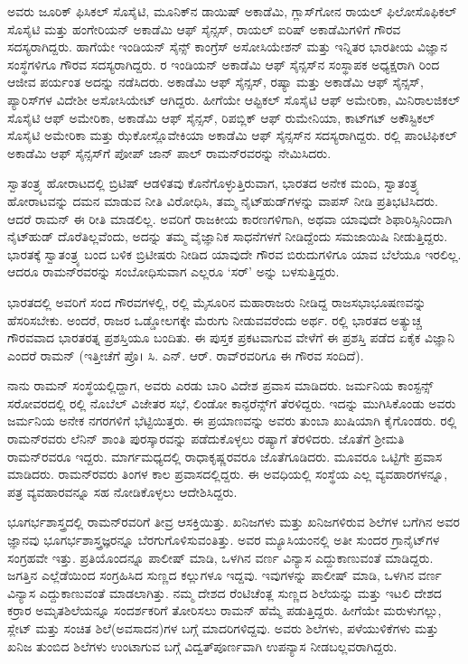 ಅವರು ಜೂರಿಕ್ ಫಿಸಿಕಲ್ ಸೊಸೈಟಿ, ಮೂನಿಕ್‌ನ ಡಾಯಿಷ್ ಅಕಾಡೆಮಿ, ಗ್ಲಾಸ್‌ಗೋನ ರಾಯಲ್ ಫಿಲೋಸೊಫಿಕಲ್ ಸೊಸೈಟಿ ಮತ್ತು ಹಂಗೇರಿಯನ್ ಅಕಾಡೆಮಿ ಆಫ್ ಸೈನ್ಸಸ್, ರಾಯಲ್ ಐರಿಷ್ ಅಕಾಡೆಮಿಗಳಿಗೆ ಗೌರವ ಸದಸ್ಯರಾಗಿದ್ದರು. ಹಾಗೆಯೇ ಇಂಡಿಯನ್ ಸೈನ್ಸ್ ಕಾಂಗ್ರೆಸ್ ಅಸೋಸಿಯೇಶನ್ ಮತ್ತು ಇನ್ನಿತರ ಭಾರತೀಯ ವಿಜ್ಞಾನ ಸಂಸ್ಥೆಗಳಿಗೂ ಗೌರವ ಸದಸ್ಯರಾಗಿದ್ದರು.  ರ ಇಂಡಿಯನ್ ಅಕಾಡೆಮಿ ಆಫ್ ಸೈನ್ಸಸ್‌ನ ಸಂಸ್ಥಾಪಕ ಅಧ್ಯಕ್ಷರಾಗಿ  ರಿಂದ ಆಜೀವ ಪರ್ಯಂತ ಅದನ್ನು ನಡೆಸಿದರು. ಅಕಾಡೆಮಿ ಆಫ್ ಸೈನ್ಸಸ್, ರಷ್ಯಾ ಮತ್ತು ಅಕಾಡೆಮಿ ಆಫ್ ಸೈನ್ಸಸ್, ಪ್ಯಾರಿಸ್‍ಗಳ ವಿದೇಶೀ ಅಸೋಸಿಯೇಟ್ ಆಗಿದ್ದರು. ಹೀಗೆಯೇ ಆಪ್ಟಿಕಲ್ ಸೊಸೈಟಿ ಆಫ್ ಅಮೇರಿಕಾ, ಮಿನಿರಾಲಜಿಕಲ್ ಸೊಸೈಟಿ ಆಫ್ ಅಮೇರಿಕಾ, ಅಕಾಡೆಮಿ ಆಫ್ ಸೈನ್ಸಸ್, ರಿಪಬ್ಲಿಕ್ ಆಫ್ ರುಮೇನಿಯಾ, ಕಾಟ್‍ಗಟ್ ಅಕೌಸ್ಟಿಕಲ್ ಸೊಸೈಟಿ ಅಮೇರಿಕಾ ಮತ್ತು ಝೆಕೋಸ್ಲೊವೇಕಿಯಾ ಅಕಾಡೆಮಿ ಆಫ್ ಸೈನ್ಸಸ್‌ನ ಸದಸ್ಯರಾಗಿದ್ದರು.  ರಲ್ಲಿ ಪಾಂಟಿಫಿಕಲ್ ಅಕಾಡೆಮಿ ಆಫ್ ಸೈನ್ಸಸ್‌ಗೆ ಪೋಪ್ ಜಾನ್ ಪಾಲ್ ರಾಮನ್‍ರವರನ್ನು ನೇಮಿಸಿದರು.

ಸ್ವಾತಂತ್ರ್ಯ ಹೋರಾಟದಲ್ಲಿ ಬ್ರಿಟಿಷ್ ಆಡಳಿತವು ಕೊನೆಗೊಳ್ಳುತ್ತಿರುವಾಗ, ಭಾರತದ ಅನೇಕ ಮಂದಿ, ಸ್ವಾತಂತ್ರ್ಯ ಹೋರಾಟವನ್ನು ದಮನ ಮಾಡುವ ನೀತಿ ವಿರೋಧಿಸಿ, ತಮ್ಮ ನೈಟ್‍ಹುಡ್‍‌ಗಳನ್ನು ವಾಪಸ್ ನೀಡಿ ಪ್ರತಿಭಟಿಸಿದರು. ಆದರೆ ರಾಮನ್‍ ಈ ರೀತಿ ಮಾಡಲಿಲ್ಲ. ಅವರಿಗೆ ರಾಜಕೀಯ ಕಾರಣಗಳಿಗಾಗಿ, ಅಥವಾ ಯಾವುದೇ ಶಿಫಾರಿಸ್ಸಿನಿಂದಾಗಿ ನೈಟ್‍ಹುಡ್ ದೊರೆತಿಲ್ಲವೆಂದು, ಅದನ್ನು ತಮ್ಮ ವೈಜ್ಞಾನಿಕ ಸಾಧನೆಗಳಗೆ ನೀಡಿದ್ದೆಂದು ಸಮಜಾಯಿಷಿ ನೀಡುತ್ತಿದ್ದರು. ಭಾರತಕ್ಕೆ ಸ್ವಾತಂತ್ರ್ಯ ಬಂದ ಬಳಿಕ ಬ್ರಿಟೀಷರು ನೀಡಿದ ಯಾವುದೇ ಗೌರವ ಬಿರುದುಗಳಿಗೂ ಯಾವ ಬೆಲೆಯೂ ಇರಲಿಲ್ಲ. ಆದರೂ ರಾಮನ್‍ರವರನ್ನು ಸಂಬೋಧಿಸುವಾಗ ಎಲ್ಲರೂ ‘ಸರ್‍’ ಅನ್ನು ಬಳಸುತ್ತಿದ್ದರು.

\newpage

ಭಾರತದಲ್ಲಿ ಅವರಿಗೆ ಸಂದ ಗೌರವಗಳಲ್ಲಿ,  ರಲ್ಲಿ ಮೈಸೂರಿನ ಮಹಾರಾಜರು ನೀಡಿದ್ದ ರಾಜಸಭಾಭೂಷಣವನ್ನು ಹೆಸರಿಸಬೇಕು. ಅಂದರೆ, ರಾಜರ ಒಡ್ಡೋಲಗಕ್ಕೇ ಮೆರುಗು ನೀಡುವವರೆಂದು ಅರ್ಥ. ರಲ್ಲಿ ಭಾರತದ ಅತ್ಯುಚ್ಚ ಗೌರವವಾದ ಭಾರತರತ್ನ ಪ್ರಶಸ್ತಿಯೂ ಬಂದಿತು. ಈ ಪುಸ್ತಕ ಪ್ರಕಟವಾಗುವ ವೇಳೆಗೆ ಈ ಪ್ರಶಸ್ತಿ ಪಡೆದ ಏಕೈಕ ವಿಜ್ಞಾನಿ ಎಂದರೆ ರಾಮನ್ (ಇತ್ತೀಚೆಗೆ ಪ್ರೊ। ಸಿ. ಎನ್. ಆರ್. ರಾವ್‌ರವರಿಗೂ ಈ ಗೌರವ ಸಂದಿದೆ).

ನಾನು ರಾಮನ್ ಸಂಸ್ಥೆಯಲ್ಲಿದ್ದಾಗ, ಅವರು ಎರಡು ಬಾರಿ ವಿದೇಶ ಪ್ರವಾಸ ಮಾಡಿದರು. ಜರ್ಮನಿಯ ಕಾಂಸ್ಟನ್ಸ್ ಸರೋವರದಲ್ಲಿ  ರಲ್ಲಿ ನೊಬೆಲ್ ವಿಜೇತರ ಸಭೆ, ಲಿಂಡೋ ಕಾನ್ಫರೆನ್ಸ್‌ಗೆ ತೆರಳಿದ್ದರು. ಇದನ್ನು ಮುಗಿಸಿಕೊಂಡು ಅವರು ಜರ್ಮನಿಯ ಅನೇಕ ನಗರಗಳಿಗೆ ಭೆಟ್ಟಿಯಿತ್ತರು. ಈ ಪ್ರಯಾಣವನ್ನು ಅವರು ತುಂಬಾ ಖುಷಿಯಾಗಿ ಕೈಗೊಂಡರು. ರಲ್ಲಿ ರಾಮನ್‍ರವರು ಲೆನಿನ್ ಶಾಂತಿ ಪುರಸ್ಕಾರವನ್ನು ಪಡೆದುಕೊಳ್ಳಲು ರಷ್ಯಾಗೆ ತೆರಳಿದರು. ಜೊತೆಗೆ ಶ‍್ರೀಮತಿ ರಾಮನ್‌ರವರೂ ಇದ್ದರು. ಮಾರ್ಗಮಧ‍್ಯದಲ್ಲಿ ರಾಧಾಕೃಷ್ಣರವರೂ ಜೊತೆಗೂಡಿದರು. ಮೂವರೂ ಒಟ್ಟಿಗೇ ಪ್ರವಾಸ ಮಾಡಿದರು. ರಾಮನ್‍ರವರು ತಿಂಗಳ ಕಾಲ ಪ್ರವಾಸದಲ್ಲಿದ್ದರು. ಈ ಅವಧಿಯಲ್ಲಿ ಸಂಸ್ಥೆಯ ಎಲ್ಲ ವ್ಯವಹಾರಗಳನ್ನೂ, ಪತ್ರ ವ್ಯವಹಾರವನ್ನೂ ಸಹ ನೋಡಿಕೊಳ್ಳಲು ಆದೇಶಿಸಿದ್ದರು.



ಭೂಗರ್ಭಶಾಸ್ತ್ರದಲ್ಲಿ ರಾಮನ್‍ರವರಿಗೆ ತೀವ್ರ ಆಸಕ್ತಿಯಿತ್ತು. ಖನಿಜಗಳು ಮತ್ತು ಖನಿಜ\-ಗಳಿರುವ ಶಿಲೆಗಳ ಬಗೆಗಿನ ಅವರ ಜ್ಞಾನವು ಭೂಗರ್ಭಶಾಸ್ತ್ರಜ್ಞರನ್ನೂ ಬೆರಗುಗೊಳಿಸುವಂತಿತ್ತು. ಅವರ ಮ್ಯೂಸಿಯಂನಲ್ಲಿ ಅತೀ ಸುಂದರ ಗ್ರಾನೈಟ್‌ಗಳ ಸಂಗ್ರಹವೇ ಇತ್ತು. ಪ್ರತಿಯೊಂದನ್ನೂ ಪಾಲೀಷ್ ಮಾಡಿ, ಒಳಗಿನ ವರ್ಣ ವಿನ್ಯಾಸ ಎದ್ದುಕಾಣುವಂತೆ ಮಾಡಿದ್ದರು. ಜಗತ್ತಿನ ಎಲ್ಲೆಡೆಯಿಂದ ಸಂಗ್ರಹಿಸಿದ ಸುಣ್ಣದ ಕಲ್ಲುಗಳೂ ಇದ್ದವು. ಇವುಗಳನ್ನು ಪಾಲೀಷ್ ಮಾಡಿ, ಒಳಗಿನ ವರ್ಣ ವಿನ್ಯಾಸ ಎದ್ದುಕಾಣುವಂತೆ ಮಾಡಲಾಗಿತ್ತು. ನಮ್ಮ ದೇಶದ ರೆಂಟಿಚೆಂತ್ಲ ಸುಣ್ಣದ ಶಿಲೆಯನ್ನು ಮತ್ತು ಇಟಲಿ ದೇಶದ ಕರ್ರಾರ ಅಮೃತಶಿಲೆಯನ್ನೂ ಸಂದರ್ಶಕರಿಗೆ ತೋರಿಸಲು ರಾಮನ್ ಹೆಮ್ಮೆ ಪಡುತ್ತಿದ್ದರು. ಹೀಗೆಯೇ ಮರುಳುಗಲ್ಲು, ಸ್ಲೇಟ್ ಮತ್ತು ಸಂಚಿತ ಶಿಲೆ(ಅವಸಾದನ)ಗಳ ಬಗ್ಗೆ ಮಾದರಿಗಳಿದ್ದವು. ಅವರು ಶಿಲೆಗಳು, ಪಳೆಯುಳಿಕೆಗಳು ಮತ್ತು ಖನಿಜ ತುಂಬಿದ ಶಿಲೆಗಳು ಉಂಟಾಗುವ ಬಗ್ಗೆ ವಿದ್ವತ್‍ಪೂರ್ಣವಾಗಿ ಉಪನ್ಯಾಸ ನೀಡಬಲ್ಲವರಾಗಿದ್ದರು.


